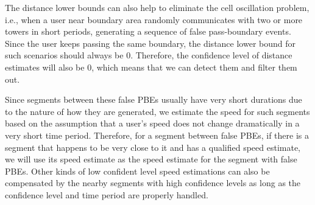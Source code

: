 The distance lower bounds can also help to eliminate the cell oscillation problem, i.e., when a user near boundary area randomly communicates with two or more towers in short periods, generating a sequence of false pass-boundary events. Since the user keeps passing the same boundary, the distance lower bound for such scenarios should always be $0$. Therefore, the confidence level of distance estimates will also be $0$, which means that we can detect them and filter them out. 

Since segments between these false PBEs usually have very short durations due to the nature of how they are generated, we estimate the speed for such segments based on the assumption that a user's speed does not change dramatically in a very short time period. Therefore, for a segment between false PBEs, if there is a segment that happens to be very close to it and has a qualified speed estimate,  we will use its speed estimate as the speed estimate for the segment with false PBEs. Other kinds of low confident level speed estimations can also be compensated by the nearby segments with high confidence levels as long as the confidence level and time period are properly handled.
 
